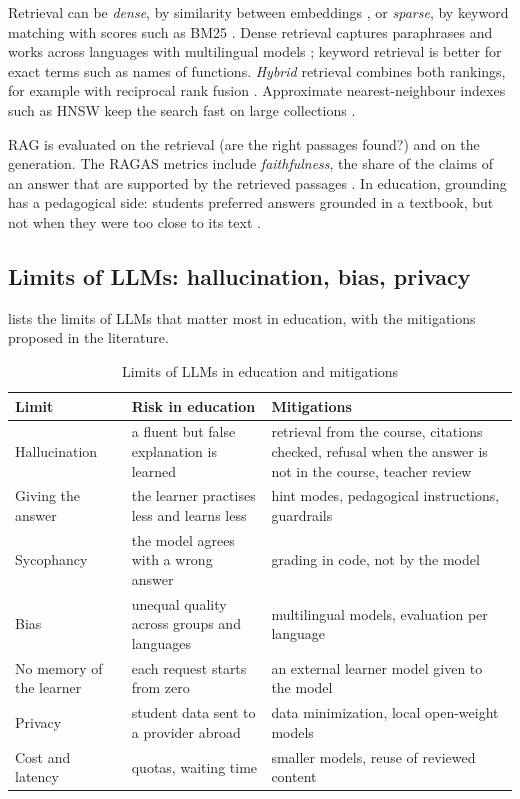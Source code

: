 Retrieval can be \emph{dense}, by similarity between embeddings
\cite{karpukhin2020}, or \emph{sparse}, by keyword matching with scores
such as BM25 \cite{robertson2009}. Dense retrieval captures paraphrases
and works across languages with multilingual models \cite{chen2024bgem3};
keyword retrieval is better for exact terms such as names of functions.
\emph{Hybrid} retrieval combines both rankings, for example with reciprocal
rank fusion \cite{cormack2009rrf}. Approximate nearest-neighbour indexes
such as HNSW keep the search fast on large collections \cite{malkov2020}.

RAG is evaluated on the retrieval (are the right passages found?) and on
the generation. The RAGAS metrics include \emph{faithfulness}, the share of
the claims of an answer that are supported by the retrieved passages
\cite{es2024ragas}. In education, grounding has a pedagogical side:
students preferred answers grounded in a textbook, but not when they were
too close to its text \cite{levonian2023}.

\subsection{Limits of LLMs: hallucination, bias, privacy}
\label{subsec-llm-limits}

 lists the limits of LLMs that matter most in
education, with the mitigations proposed in the literature.

\begin{table}[htbp]
\centering
\caption{Limits of LLMs in education and mitigations}
\label{tab-llm-limits}
\small
\begin{tabularx}{\textwidth}{@{}L{2.8cm}YY@{}}
\toprule
\textbf{Limit} & \textbf{Risk in education} & \textbf{Mitigations} \\
\midrule
Hallucination \cite{ji2023hallucination} & a fluent but false explanation is learned & retrieval from the course, citations checked, refusal when the answer is not in the course, teacher review \\
Giving the answer \cite{macina2023mathdial,bastani2025} & the learner practises less and learns less & hint modes, pedagogical instructions, guardrails \\
Sycophancy \cite{sharma2024sycophancy} & the model agrees with a wrong answer & grading in code, not by the model \\
Bias \cite{bender2021,gallegos2024} & unequal quality across groups and languages \cite{lai2023} & multilingual models, evaluation per language \\
No memory of the learner & each request starts from zero & an external learner model given to the model \\
Privacy \cite{carlini2021} & student data sent to a provider abroad & data minimization, local open-weight models \\
Cost and latency & quotas, waiting time & smaller models, reuse of reviewed content \\
\bottomrule
\end{tabularx}
\end{table}

